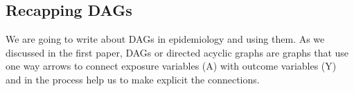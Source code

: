 \hypertarget{recapping-dags}{%
\subsection{Recapping DAGs}\label{recapping-dags}}

We are going to write about DAGs in epidemiology and using them. As we
discussed in the first paper, DAGs or directed acyclic graphs are graphs
that use one way arrows to connect exposure variables (A) with outcome
variables (Y) and in the process help us to make explicit the
connections.
